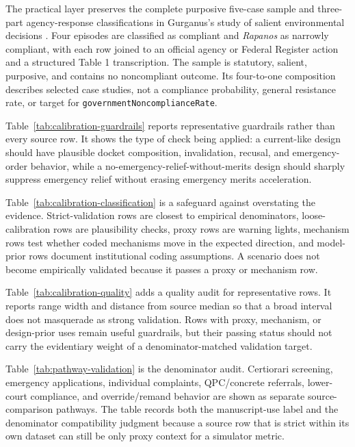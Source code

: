 \documentclass[
    journal=jlc,
    manuscript=research-article,
    year=2026,
  ]{cup-journal}
\newcommand{\jlcite}[1]{\autocite{#1}}
\newcommand{\jlcite}[1]{\citep{#1}}
\begin{document}
The practical layer preserves the complete purposive five-case sample and three-part agency-response classifications in Gurganus's study of salient environmental decisions \jlcite{Gurganus2025}. Four episodes are classified as compliant and \emph{Rapanos} as narrowly compliant, with each row joined to an official agency or Federal Register action and a structured Table 1 transcription. The sample is statutory, salient, purposive, and contains no noncompliant outcome. Its four-to-one composition describes selected case studies, not a compliance probability, general resistance rate, or target for \texttt{governmentNoncomplianceRate}.

Table~\ref{tab:calibration-guardrails} reports representative guardrails rather than every source row. It shows the type of check being applied: a current-like design should have plausible docket composition, invalidation, recusal, and emergency-order behavior, while a no-emergency-relief-without-merits design should sharply suppress emergency relief without erasing emergency merits acceleration.





Table~\ref{tab:calibration-classification} is a safeguard against overstating the evidence. Strict-validation rows are closest to empirical denominators, loose-calibration rows are plausibility checks, proxy rows are warning lights, mechanism rows test whether coded mechanisms move in the expected direction, and model-prior rows document institutional coding assumptions. A scenario does not become empirically validated because it passes a proxy or mechanism row.



Table~\ref{tab:calibration-quality} adds a quality audit for representative rows. It reports range width and distance from source median so that a broad interval does not masquerade as strong validation. Rows with proxy, mechanism, or design-prior uses remain useful guardrails, but their passing status should not carry the evidentiary weight of a denominator-matched validation target.



Table~\ref{tab:pathway-validation} is the denominator audit. Certiorari screening, emergency applications, individual complaints, QPC/concrete referrals, lower-court compliance, and override/remand behavior are shown as separate source-comparison pathways. The table records both the manuscript-use label and the denominator compatibility judgment because a source row that is strict within its own dataset can still be only proxy context for a simulator metric.
\end{document}
